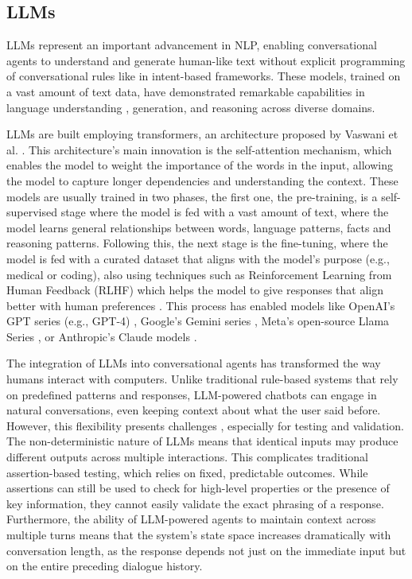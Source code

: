 \subsection{\aclp{LLM}}

\aclp{LLM} represent an important advancement in \acl{NLP},
enabling conversational agents to understand and generate human-like text
without explicit programming of conversational rules like in intent-based frameworks.
These models, trained on a vast amount of text data,
have demonstrated remarkable capabilities in
language understanding \autocite{liEnhancingNaturalLanguage2024}, generation, and reasoning across diverse domains.

\aclp{LLM} are built employing transformers,
an architecture proposed by Vaswani et al. \autocite{vaswaniAttentionAllYou2017}.
This architecture's main innovation is the self-attention mechanism,
which enables the model to weight the importance of the words in the input,
allowing the model to capture longer dependencies and understanding the context.
These models are usually trained in two phases,
the first one, the pre-training,
is a self-supervised stage where the model
is fed with a vast amount of text,
where the model learns
general relationships between words,
language patterns, facts and reasoning patterns.
Following this, the next stage is the fine-tuning,
where the model is fed with a curated dataset
that aligns with the model's purpose (e.g., medical or coding),
also using techniques such as
Reinforcement Learning from Human Feedback (RLHF)
which helps the model to give responses
that align better with human preferences
\autocite{zieglerFineTuningLanguageModels2020}.
This process has enabled models like
OpenAI's GPT series (e.g., GPT-4) \autocite{OpenAI2025},
Google's Gemini series \autocite{GoogleGemini},
Meta's open-source Llama Series \autocite{touvronLLaMAOpenEfficient2023},
or Anthropic's Claude models \autocite{ClaudeAnthropic}.


The integration of \acp{LLM} into conversational agents
has transformed the way humans interact with computers.
Unlike traditional rule-based systems that rely on predefined patterns and responses,
\ac{LLM}-powered chatbots can engage in natural conversations,
even keeping context about what the user said before.
However, this flexibility presents challenges
\autocite{zamfirescu-pereiraHerdingAICats2023},
especially for testing and validation.
The non-deterministic nature of \acp{LLM} means that
identical inputs may produce different outputs across multiple interactions.
This complicates traditional assertion-based testing,
which relies on fixed, predictable outcomes.
While assertions can still be used
to check for high-level properties or the presence of key information,
they cannot easily validate the exact phrasing of a response.
Furthermore, the ability of \ac{LLM}-powered agents
to maintain context across multiple turns
means that the system's state space increases dramatically with conversation length,
as the response depends not just on the immediate input
but on the entire preceding dialogue history.


